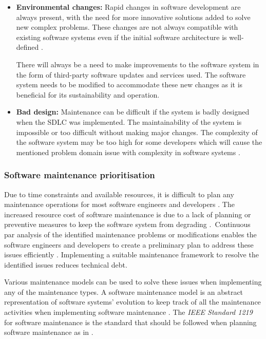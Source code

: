 \begin{itemize}
	\item \textbf{Environmental changes:} Rapid changes in software development are always present, with the need for more innovative solutions added to solve new complex problems. These changes are not always compatible with existing software systems even if the initial software architecture is well-defined \cite{Ogheneovo2014}. \par There will always be a need to make improvements to the software system in the form of third-party software updates and services used. The software system needs to be modified to accommodate these new changes as it is beneficial for its sustainability and operation.
	\item \textbf{Bad design:} Maintenance can be difficult if the system is badly designed when the SDLC was implemented. The maintainability of the system is impossible or too difficult without making major changes. The complexity of the software system may be too high for some developers which will cause the mentioned problem domain issue with complexity in software systems \cite{Lenarduzzi2017}.
\end{itemize}

\clearpage

\subsubsection{Software maintenance prioritisation}\label{sec:ch1_maintenanceModel}
Due to time constraints and available resources, it is difficult to plan any maintenance operations for most software engineers and developers \cite{DeLeon-Sigg2020}. The increased resource cost of software maintenance is due to a lack of planning or preventive measures to keep the software system from degrading \cite{Alenezi2016}.\ Continuous par analysis of the identified maintenance problems or modifications enables the software engineers and developers to create a preliminary plan to address these issues efficiently \cite{Port2017}. Implementing a suitable maintenance framework to resolve the identified issues reduces technical debt.\par Various maintenance models can be used to solve these issues when implementing any of the maintenance types. A software maintenance model is an abstract representation of software systems' evolution to keep track of all the maintenance activities when implementing software maintenance \cite{Ren2011}. The \textit{IEEE Standard 1219} for software maintenance is the standard that should be followed when planning software maintenance as in . 

